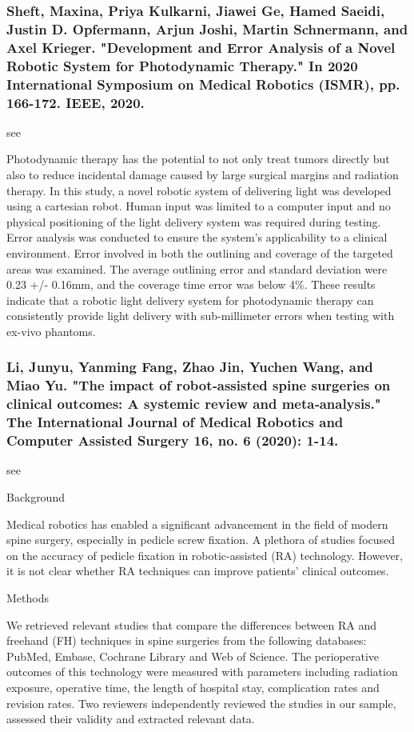 \documentclass[conference]{IEEEtran}
\begin{document}
\medskip
\subsubsection{Sheft, Maxina, Priya Kulkarni, Jiawei Ge, Hamed Saeidi, Justin D. Opfermann, Arjun Joshi, Martin Schnermann, and Axel Krieger. "Development and Error Analysis of a Novel Robotic System for Photodynamic Therapy." In 2020 International Symposium on Medical Robotics (ISMR), pp. 166-172. IEEE, 2020.}
see \cite{sheft2020development}

Photodynamic therapy has the potential to not only treat tumors directly but also to reduce incidental damage caused by large surgical margins and radiation therapy. In this study, a novel robotic system of delivering light was developed using a cartesian robot. Human input was limited to a computer input and no physical positioning of the light delivery system was required during testing. Error analysis was conducted to ensure the system's applicability to a clinical environment. Error involved in both the outlining and coverage of the targeted areas was examined. The average outlining error and standard deviation were 0.23 +/- 0.16mm, and the coverage time error was below 4\%. These results indicate that a robotic light delivery system for photodynamic therapy can consistently provide light delivery with sub-millimeter errors when testing with ex-vivo phantoms.


\medskip
\subsubsection{Li, Junyu, Yanming Fang, Zhao Jin, Yuchen Wang, and Miao Yu. "The impact of robot‐assisted spine surgeries on clinical outcomes: A systemic review and meta‐analysis." The International Journal of Medical Robotics and Computer Assisted Surgery 16, no. 6 (2020): 1-14.}
see \cite{li2020impact}

Background

Medical robotics has enabled a significant advancement in the field of modern spine surgery, especially in pedicle screw fixation. A plethora of studies focused on the accuracy of pedicle fixation in robotic-assisted (RA) technology. However, it is not clear whether RA techniques can improve patients' clinical outcomes.

Methods

We retrieved relevant studies that compare the differences between RA and freehand (FH) techniques in spine surgeries from the following databases: PubMed, Embase, Cochrane Library and Web of Science. The perioperative outcomes of this technology were measured with parameters including radiation exposure, operative time, the length of hospital stay, complication rates and revision rates. Two reviewers independently reviewed the studies in our sample, assessed their validity and extracted relevant data.
\end{document}

